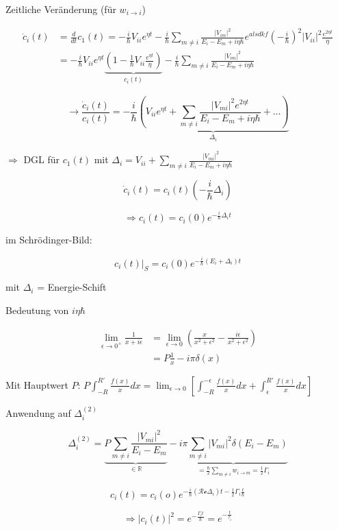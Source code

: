 Zeitliche Veränderung (für \(w_{i\rightarrow i}\))

\begin{align}
  \dot c_i(t) &= \frac{d}{dt} c_1(t) = -\frac{i}{\hbar}V_{ii} e^{\eta t}-\frac{i}{\hbar}\sum_{m\neq i}\frac{|V_{im}|^2}{E_i-E_m+i\eta\hbar}e^{alsdkf}\left(-\frac{i}{\hbar}\right)^2|V_{ii}|^2\frac{e^{2\eta t}}{\eta}\\
  &= -\frac{i}{\hbar}V_{ii}e^{\eta t}\underbrace{\left(1-\frac{1}{\hbar}V_{ii}\frac{e^{\eta t}}{\eta} \right)}_{c_i(t)}-\frac{i}{\hbar} \sum_{m\neq i}\frac{|V_{im}|^2}{E_i-E_m+i\eta\hbar}
\end{align}


\[\rightarrow \frac{\dot c_i(t)}{c_i(t)} = -\frac{i}{\hbar}\underbrace{(V_{ii}e^{\eta t}+\sum_{m\neq i}\frac{|V_{mi}|^2e^{2\eta t}}{E_i-E_m+i\eta \hbar}+...)}_{\Delta_i}\]

\(\Rightarrow \) DGL für \(c_1(t)\) mit \(\Delta_i = V_{ii}+\sum_{m\neq i}\frac{|V_{mi}|^2}{E_i-E_m+i\eta \hbar}\)

\[ \dot c_i(t) = c_i(t)(-\frac{i}{\hbar}\Delta_i) \]

\[\boxed{\Rightarrow c_i(t) = c_i(0)e^{-\frac{i}{\hbar}\Delta_i t}}\]

im Schrödinger-Bild:

\[\left.c_i(t)\right|_S=c_i(0)e^{-\frac{i}{\hbar}(E_i+\Delta_i)t}\]

mit \(\Delta_i\) = Energie-Schift

Bedeutung von \(i\eta\hbar\)

\begin{align}
\lim_{\epsilon \to 0^+}\frac{1}{x+i\epsilon} &=\lim_{\epsilon \to 0}\left( \frac{x}{x^2+\epsilon^2}-\frac{i\epsilon}{x^2+\epsilon^2}\right)\\
&= P\frac{1}{x}-i\pi \delta(x)
\end{align}

Mit Hauptwert \(P\):  \(P\int_{-R}^{R'}\frac{f(x)}{x}dx= \lim_{\epsilon \to 0}[\int_{-R}^{-\epsilon}\frac{f(x)}{x}dx +\int_\epsilon^{R'}\frac{f(x)}{x}dx] \)

Anwendung auf \(\Delta_i^{(2)}\)

\[\Delta_i^{(2)}= \underbrace{P\sum_{m\neq i}\frac{|V_{mi}|^2}{E_i-E_m}}_{\in \mathbb R}-\underbrace{i\pi\sum_{m\neq i}|V_{mi}|^2\delta(E_i-E_m)}_{=\frac{\hbar}{2}\sum_{m\neq i}w_{i\to m}=\frac{1}{2}\Gamma_i}\]

\[c_i(t) = c_i(o)e^{-\frac{i}{\hbar}(\mathcal{Re}\Delta_i)t-\frac{1}{2}\Gamma_i\frac{t}{\hbar}}\]

\[\Rightarrow |c_i(t)|^2 = e^{-\frac{\Gamma_i t}{\hbar}}= e^{-\frac{t}{\tau_i}}\]

